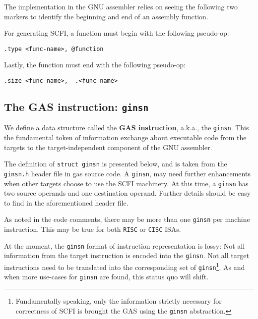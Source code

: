 \documentclass{article} \usepackage[a4paper, total={6in, 8in}]{geometry}
\begin{document}
The implementation in the GNU assembler relies on seeing the following two
markers to identify the beginning and end of an assembly function.

For generating SCFI, a function must begin with the following pseudo-op:

\begin{center}
\begin{verbatim}
.type <func-name>, @function
\end{verbatim}
\end{center}

Lastly, the function must end with the following pseudo-op:

\begin{center}
\begin{verbatim}
.size <func-name>, -.<func-name>
\end{verbatim}
\end{center}

\subsection{The GAS instruction: \texttt{ginsn}}
We define a data structure called the \textbf{GAS instruction}, a.k.a., the
\texttt{ginsn}.  This the fundamental token of information exchange about
executable code from the targets to the target-independent component of the GNU
assembler.

The definition of \texttt{struct ginsn} is presented below, and is taken from
the \texttt{ginsn.h} header file in gas source code. A \texttt{ginsn}, may need
further enhancements when other targets choose to use the SCFI machinery.  At
this time, a \texttt{ginsn} has two source operands and one destination
operand.  Further details should be easy to find in the aforementioned header
file.

As noted in the code comments, there may be more than one \texttt{ginsn} per
machine instruction.  This may be true for both \texttt{RISC} or \texttt{CISC}
ISAs.

At the moment, the \texttt{ginsn} format of instruction representation is
lossy: Not all information from the target instruction is encoded into the
\texttt{ginsn}.  Not all target instructions need to be translated into the
corresponding set of \texttt{ginsn}\footnote{Fundamentally speaking, only
the information strictly necessary for correctness of SCFI is brought the GAS
  using the \texttt{ginsn} abstraction.}.  As and when more use-cases for
\texttt{ginsn} are found, this status quo will shift.
\end{document}
